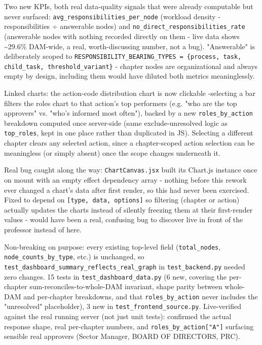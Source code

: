 Two new KPIs, both real data-quality signals that were already computable but never surfaced: \texttt{avg\_\allowbreak{}responsibilities\_\allowbreak{}per\_\allowbreak{}node} (workload density - responsibilities ÷ answerable nodes) and \texttt{no\_\allowbreak{}direct\_\allowbreak{}responsibilities\_\allowbreak{}rate} (answerable nodes with nothing recorded directly on them - live data shows \textasciitilde{}29.6\% DAM-wide, a real, worth-discussing number, not a bug). "Answerable" is deliberately scoped to \texttt{RESPONSIBILITY\_\allowbreak{}BEARING\_\allowbreak{}TYPES = \{process, task, child\_\allowbreak{}task, threshold\_\allowbreak{}variant\}} - chapter nodes are organizational and always empty by design, including them would have diluted both metrics meaninglessly.

Linked charts: the action-code distribution chart is now clickable -selecting a bar filters the roles chart to that action's top performers (e.g. "who are the top approvers" vs. "who's informed most often"), backed by a new \texttt{roles\_\allowbreak{}by\_\allowbreak{}action} breakdown computed once server-side (same exclude-unresolved logic as \texttt{top\_\allowbreak{}roles}, kept in one place rather than duplicated in JS). Selecting a different chapter clears any selected action, since a chapter-scoped action selection can be meaningless (or simply absent) once the scope changes underneath it.

Real bug caught along the way: \texttt{ChartCanvas.jsx} built its Chart.js instance once on mount with an empty effect dependency array - nothing before this rework ever changed a chart's data after first render, so this had never been exercised. Fixed to depend on \texttt{[type, data, options]} so filtering (chapter or action) actually updates the charts instead of silently freezing them at their first-render values - would have been a real, confusing bug to discover live in front of the professor instead of here.

Non-breaking on purpose: every existing top-level field (\texttt{total\_\allowbreak{}nodes}, \texttt{node\_\allowbreak{}counts\_\allowbreak{}by\_\allowbreak{}type}, etc.) is unchanged, so \texttt{test\_\allowbreak{}dashboard\_\allowbreak{}summary\_\allowbreak{}reflects\_\allowbreak{}real\_\allowbreak{}graph} in \texttt{test\_\allowbreak{}backend.py} needed zero changes. 15 tests in \texttt{test\_\allowbreak{}dashboard\_\allowbreak{}data.py} (6 new, covering the per-chapter sum-reconciles-to-whole-DAM invariant, shape parity between whole-DAM and per-chapter breakdowns, and that \texttt{roles\_\allowbreak{}by\_\allowbreak{}action} never includes the "unresolved" placeholder), 3 new in \texttt{test\_\allowbreak{}frontend\_\allowbreak{}source.py}. Live-verified against the real running server (not just unit tests): confirmed the actual response shape, real per-chapter numbers, and \texttt{roles\_\allowbreak{}by\_\allowbreak{}action["A"]} surfacing sensible real approvers (Sector Manager, BOARD OF DIRECTORS, PRC).


